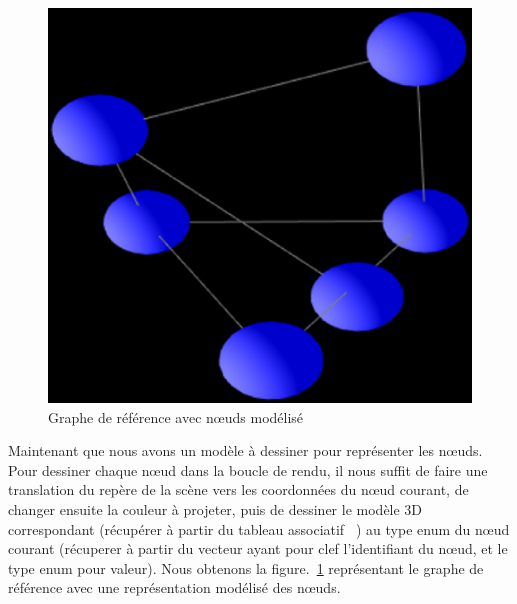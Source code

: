 \documentclass[a4paper, 11pt]{article}
\begin{document}
\begin{figure}[h]
  \begin{center}
    \includegraphics[scale=0.4]{contents/gnode}
  \end{center}
  \caption{Graphe de référence avec nœuds modélisé}
  \label{fig:gnode}
\end{figure}

Maintenant que nous avons un modèle à dessiner pour représenter les nœuds. Pour dessiner chaque nœud dans la boucle de rendu, il nous suffit de faire une translation du repère de la scène vers les coordonnées du nœud courant, de changer ensuite la couleur à projeter, puis de dessiner le modèle 3D correspondant (récupérer à partir du tableau associatif \texttt{ }) au type enum du nœud courant (récuperer à partir du vecteur ayant pour clef l'identifiant du nœud, et le type enum pour valeur). Nous obtenons la figure.~\ref{fig:gnode} représentant le graphe de référence avec une représentation modélisé des nœuds.

\end{document}
